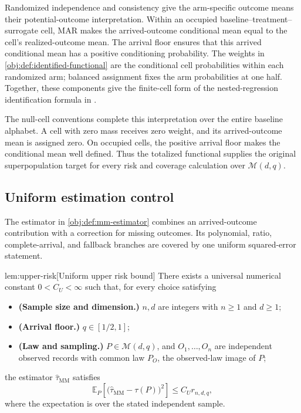 Randomized independence and consistency give the arm-specific outcome means their potential-outcome interpretation. Within an occupied baseline--treatment--surrogate cell, MAR makes the arrived-outcome conditional mean equal to the cell's realized-outcome mean. The arrival floor ensures that this arrived conditional mean has a positive conditioning probability. The weights in \cref{obj:def:identified-functional} are the conditional cell probabilities within each randomized arm; balanced assignment fixes the arm probabilities at one half. Together, these components give the finite-cell form of the nested-regression identification formula in \citet[Lemma~1.1, equation~(10), under Assumptions~1--3]{KallusMao2025}.

The null-cell conventions complete this interpretation over the entire baseline alphabet. A cell with zero mass receives zero weight, and its arrived-outcome mean is assigned zero. On occupied cells, the positive arrival floor makes the conditional mean well defined. Thus the totalized functional supplies the original superpopulation target for every risk and coverage calculation over \(\mathcal M(d,q)\).

\subsection{Uniform estimation control}

The estimator in \cref{obj:def:mm-estimator} combines an arrived-outcome contribution with a correction for missing outcomes. Its polynomial, ratio, complete-arrival, and fallback branches are covered by one uniform squared-error statement.

\begin{lemmav}{lem:upper-risk}[Uniform upper risk bound]
There exists a universal numerical constant \(0<C_U<\infty\) such that, for every choice satisfying
\begin{itemize}
\item \textbf{(Sample size and dimension.)} \(n,d\) are integers with \(n\ge1\) and \(d\ge1\);
\item \textbf{(Arrival floor.)} \(q\in[1/2,1]\);
\item \textbf{(Law and sampling.)} \(P\in\mathcal M(d,q)\), and \(O_1,\ldots,O_n\) are independent observed records with common law \(P_O\), the observed-law image of \(P\);
\end{itemize}
the estimator \(\widehat\tau_{\mathrm{MM}}\) satisfies
\[
\mathbb E_P\!\left[
  \bigl(\widehat\tau_{\mathrm{MM}}-\tau(P)\bigr)^2
\right]
\le C_U r_{n,d,q},
\]
where the expectation is over the stated independent sample.
\end{lemmav}

